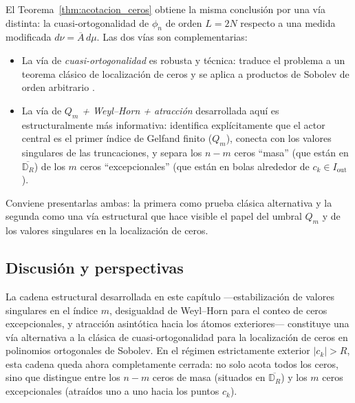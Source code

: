 \begin{rmk}\label{rem:comparacion_vias}
	El Teorema~\ref{thm:acotacion_ceros} obtiene la misma conclusión por una vía distinta: la cuasi-ortogonalidad de $\phi_n$ de orden $L=2N$ respecto a una medida modificada $d\nu=\overline{A}\,d\mu$. Las dos vías son complementarias:
	\begin{itemize}
		\item La vía de \emph{cuasi-ortogonalidad} es robusta y técnica: traduce el problema a un teorema clásico de localización de ceros y se aplica a productos de Sobolev de orden arbitrario \cite{lopez1999zero}.
		\item La vía de \emph{$Q_m$ + Weyl--Horn + atracción} desarrollada aquí es estructuralmente más informativa: identifica explícitamente que el actor central es el primer índice de Gelfand finito ($Q_m$), conecta con los valores singulares de las truncaciones, y separa los $n-m$ ceros ``masa'' (que están en $\overline{\mathbb{D}_R}$) de los $m$ ceros ``excepcionales'' (que están en bolas alrededor de $c_k\in I_{\mathrm{out}}$).
	\end{itemize}

	Conviene presentarlas ambas: la primera como prueba clásica alternativa y la segunda como una vía estructural que hace visible el papel del umbral $Q_m$ y de los valores singulares en la localización de ceros.
\end{rmk}

\subsection{Discusión y perspectivas}

La cadena estructural desarrollada en este capítulo ---estabilización de valores singulares en el índice $m$, desigualdad de Weyl--Horn para el conteo de ceros excepcionales, y atracción asintótica hacia los átomos exteriores--- constituye una vía alternativa a la clásica de cuasi-ortogonalidad para la localización de ceros en polinomios ortogonales de Sobolev. En el régimen estrictamente exterior $|c_k|>R$, esta cadena queda ahora completamente cerrada: no solo acota todos los ceros, sino que distingue entre los $n-m$ ceros de masa (situados en $\overline{\mathbb{D}_R}$) y los $m$ ceros excepcionales (atraídos uno a uno hacia los puntos $c_k$).

